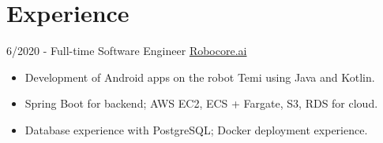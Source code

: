 \documentclass[letterpaper]{twentysecondcv} %
\begin{document}
\makeprofile %



\section{Experience}{\faAlignJustify}

\begin{twenty} %


\twentyitem
    	{6/2020 - }
	{}
         {Full-time Software Engineer}
         {\href{https://www.robocore.ai}{Robocore.ai}}
        {}
        {\vspace{-2mm}\begin{itemize}[topsep=0pt,partopsep=0pt]
				\item Development of Android apps on the robot Temi using Java and Kotlin.
				\item Spring Boot for backend; AWS EC2, ECS + Fargate, S3, RDS for cloud.
				\item Database experience with PostgreSQL; Docker deployment experience.
				\end{itemize} }\\


\end{twenty}
\end{document}
